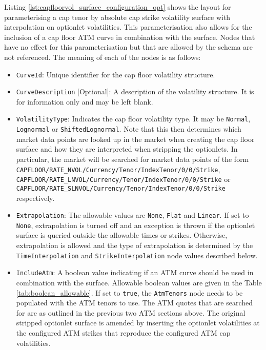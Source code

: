 Listing \ref{lst:capfloorvol_surface_configuration_opt} shows the layout for parameterising a cap tenor by absolute cap strike volatility surface with interpolation on optionlet volatilities. This parameterisation also allows for the inclusion of a cap floor ATM curve in combination with the surface. Nodes that have no effect for this parameterisation but that are allowed by the schema are not referenced. The meaning of each of the nodes is as follows:

\begin{itemize}
\item
\lstinline!CurveId!: Unique identifier for the cap floor volatility structure.

\item \lstinline!CurveDescription! [Optional]:
A description of the volatility structure. It is for information only and may be left blank.

\item \lstinline!VolatilityType!:
Indicates the cap floor volatility type. It may be \lstinline!Normal!, \lstinline!Lognormal! or \lstinline!ShiftedLognormal!. Note that this then determines which market data points are looked up in the market when creating the cap floor surface and how they are interpreted when stripping the optionlets. In particular, the market will be searched for market data points of the form \lstinline!CAPFLOOR/RATE_NVOL/Currency/Tenor/IndexTenor/0/0/Strike!, \lstinline!CAPFLOOR/RATE_LNVOL/Currency/Tenor/IndexTenor/0/0/Strike! or \lstinline!CAPFLOOR/RATE_SLNVOL/Currency/Tenor/IndexTenor/0/0/Strike! respectively.

\item \lstinline!Extrapolation!:
The allowable values are \lstinline!None!, \lstinline!Flat! and \lstinline!Linear!. If set to \lstinline!None!, extrapolation is turned off and an exception is thrown if the optionlet surface is queried outside the allowable times or strikes. Otherwise, extrapolation is allowed and the type of extrapolation is determined by the \lstinline!TimeInterpolation! and \lstinline!StrikeInterpolation! node values described below.

\item \lstinline!IncludeAtm!:
A boolean value indicating if an ATM curve should be used in combination with the surface. Allowable boolean values are given in the Table \ref{tab:boolean_allowable}. If set to \lstinline!true!, the \lstinline!AtmTenors! node needs to be populated with the ATM tenors to use. The ATM quotes that are searched for are as outlined in the previous two ATM sections above. The original stripped optionlet surface is amended by inserting the optionlet volatilities at the configured ATM strikes that reproduce the configured ATM cap volatilities.


\end{itemize}
